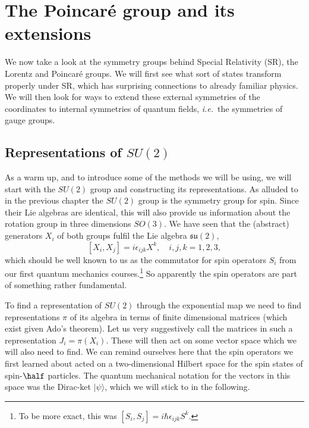 \documentclass[notes.tex]{subfiles}
\begin{document}
\chapter{The Poincaré group and its extensions}
\label{chap:poincare}

We now take a look at the symmetry groups behind Special Relativity (SR), the Lorentz and Poincaré groups. We will first see what sort of states transform properly under SR, which has surprising connections to already familiar physics. We will then look for ways to extend these external symmetries of the coordinates to internal symmetries of quantum fields, {\it i.e.}\ the symmetries of gauge groups.



\section{Representations of $SU(2)$}
\label{sec:su2_rep}
As a warm up, and to introduce some of the methods we will be using, we will start with the $SU(2)$ group and constructing its representations. As alluded to in the previous chapter the $SU(2)$ group is the symmetry group for spin.  Since their Lie algebras are identical, this will also provide us information about  the rotation group in three dimensions $SO(3)$. We have seen that the (abstract) generators $X_i$ of both  groups fulfil the Lie algebra $\mathfrak{su}(2)$,
\[ [X_i,X_j]=i\epsilon_{ijk} X^k,\quad i,j,k=1,2,3,\]
which should be well known to us as the commutator for spin operators $S_i$ from our first quantum mechanics courses.\footnote{To be more exact, this was $[S_i,S_j]=i\hbar\epsilon_{ijk} S^k$. } So apparently the spin operators are part of something rather fundamental.

To find a representation of $SU(2)$ through the exponential map we need to find representations $\pi$ of its algebra in terms of finite dimensional matrices (which exist given Ado's theorem). Let us very suggestively call the matrices in such a representation $J_i=\pi(X_i)$. These will then act on some vector space which we will also need to find. We can remind ourselves here that the spin operators we first learned about acted on a two-dimensional Hilbert space for the spin states of spin-$\half$ particles. The quantum mechanical notation for the vectors in this space was the Dirac-ket $|\psi\rangle$, which we will stick to in the following.
\end{document}
